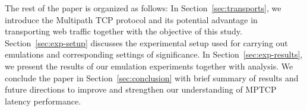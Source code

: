 The rest of the paper is organized as follows: In Section~\ref{sec:transports}, we introduce the Multipath TCP protocol and its potential advantage in transporting
web traffic together with the objective of this study. Section~\ref{sec:exp-setup} discusses the experimental setup used for carrying out emulations and
corresponding settings of significance. In Section~\ref{sec:exp-results}, we present the results of our emulation experiments together with analysis.
We conclude the paper in Section~\ref{sec:conclusion} with brief summary of results and future directions to improve and strengthen our understanding of 
MPTCP latency performance.

